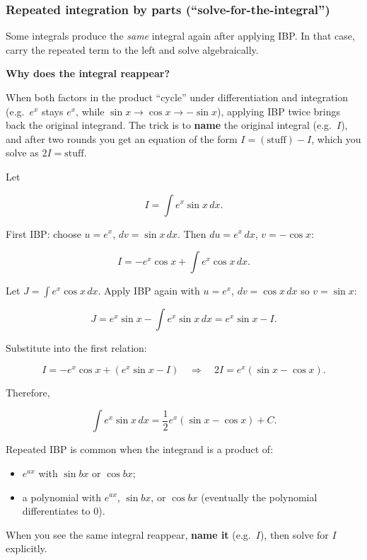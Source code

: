 \subsubsection*{Repeated integration by parts (``solve-for-the-integral'')}

\noindent
Some integrals produce the \emph{same} integral again after applying IBP. In that case, carry the repeated term to the left and solve algebraically.

\textbf{Why does the integral reappear?}

When both factors in the product ``cycle'' under differentiation and integration (e.g.\ $e^x$ stays $e^x$, while $\sin x \to \cos x \to -\sin x$), applying IBP twice brings back the original integrand. The trick is to \textbf{name} the original integral (e.g.\ $I$), and after two rounds you get an equation of the form $I = (\text{stuff}) - I$, which you solve as $2I = \text{stuff}$.

\begin{examplebox}[title={Worked Example: $\displaystyle \int e^x\sin x\,dx$ (two rounds of IBP)}]

Let

\[
I=\int e^x\sin x\,dx.
\]

First IBP: choose $u=e^x$, $dv=\sin x\,dx$. Then $du=e^x\,dx$, $v=-\cos x$:

\[
I = -e^x\cos x + \int e^x\cos x\,dx.
\]

Let $J=\int e^x\cos x\,dx$. Apply IBP again with $u=e^x$, $dv=\cos x\,dx$ so $v=\sin x$:

\[
J = e^x\sin x - \int e^x\sin x\,dx = e^x\sin x - I.
\]

Substitute into the first relation:

\[
I = -e^x\cos x + (e^x\sin x - I)
\quad\Longrightarrow\quad
2I = e^x(\sin x-\cos x).
\]

Therefore,

\[
\int e^x\sin x\,dx = \frac12 e^x(\sin x-\cos x)+C.
\]

\end{examplebox}

\begin{examtip}[title={Exam Focus: When repeated IBP is likely}]

Repeated IBP is common when the integrand is a product of:

\begin{itemize}
\item $e^{ax}$ with $\sin bx$ or $\cos bx$;
\item a polynomial with $e^{ax}$, $\sin bx$, or $\cos bx$ (eventually the polynomial differentiates to $0$).
\end{itemize}

When you see the same integral reappear, \textbf{name it} (e.g.\ $I$), then solve for $I$ explicitly.

\end{examtip}

